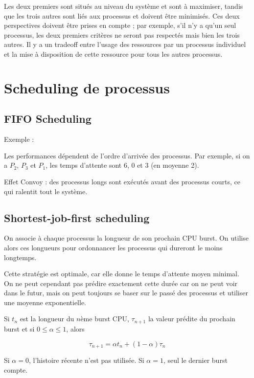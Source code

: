 Les deux premiers sont situés au niveau du système et sont à maximiser, tandis que les trois autres sont liés aux processus et doivent être minimisés. Ces deux perspectives doivent être prises en compte ; par exemple, s'il n'y a qu'un seul processus, les deux premiers critères ne seront pas respectés mais bien les trois autres. Il y a un tradeoff entre l'usage des ressources par un processus individuel et la mise à disposition de cette ressource pour tous les autres processus.

\section{Scheduling de processus}

\subsection{FIFO Scheduling}

Exemple :


Les performances dépendent de l'ordre d'arrivée des processus. Par exemple, si on a $P_2$, $P_3$ et $P_1$, les temps d'attente sont 6, 0 et 3 (en moyenne 2).

Effet Convoy : des processus longs sont exécutés avant des processus courts, ce qui ralentit tout le système.

\subsection{Shortest-job-first scheduling}

On associe à chaque processus la longueur de son prochain CPU burst. On utilise alors ces longueurs pour ordonnancer les processus qui dureront le moins longtemps.

Cette stratégie est optimale, car elle donne le temps d'attente moyen minimal. On ne peut cependant pas prédire exactement cette durée car on ne peut voir dans le futur, mais on peut toujours se baser sur le passé des processus et utiliser une moyenne exponentielle.

Si $t_n$ est la longueur du $n$ème burst CPU, $\tau_{n+1}$ la valeur prédite du prochain burst et si $0 \leq \alpha \leq 1$, alors

$$\tau_{n + 1} = \alpha t_n + (1 - \alpha) \tau_n$$

Si $\alpha = 0$, l'histoire récente n'est pas utilisée. Si $\alpha = 1$, seul le dernier burst compte.

